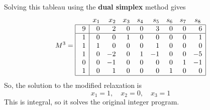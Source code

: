 Solving this tableau using the {\bf dual simplex} method gives
       \begin{displaymath}
         M^3 =
         \begin{array}{|r|rrrrrrrr|}
            \multicolumn{1}{c}{\quad} & x_1 & x_2 & x_3 & s_4 & s_5 & s_6 &
                s_7 & \multicolumn{1}{c}{s_8} \\ \hline
             9 & 0 & 2 & 0 & 0 & 3 & 0 & 0 & 6 \\ \hline
             1 & 0 & 0 & 1 & 0 & 0 & 0 & 0 & 1 \\
             1 & 1 & 0 & 0 & 0 & 1 & 0 & 0 & 0 \\
             1 & 0 & -2 & 0 & 1 & -1 & 0 & 0 & -5 \\
             0 & 0 & -1 & 0 & 0 & 0 & 0 & 1 & -1 \\
             1 & 0 & 1 & 0 & 0 & 0 & 1 & 0 & 0 \\ \hline
         \end{array}
       \end{displaymath}
So, the solution to the modified relaxation is
\begin{displaymath}
  x_1=1, \quad x_2=0, \quad x_3=1
\end{displaymath}
This is integral, so it solves the original integer program.


